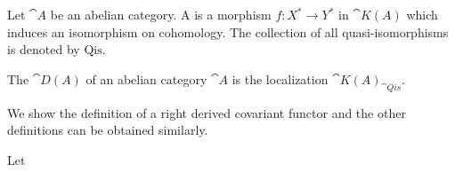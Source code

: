 \begin{center}
\end{center}
\begin{definition}
    Let $\cat{A}$ be an abelian category. A  is a morphism $f:{X}^{*}\to{Y}^{*}$ in $\cat{K(A)}$ which induces an isomorphism on cohomology. The collection of all quasi-isomorphisms is denoted by $\text{Qis}$.
\end{definition}
\begin{definition}
    The  $\cat{D(A)}$ of an abelian category $\cat{A}$ is the localization ${\cat{K(A)}}_{\cat{Qis}}$.
\end{definition}
We show the definition of a right derived covariant functor and the other definitions can be obtained similarly.
\begin{definition}
    Let 
\end{definition}